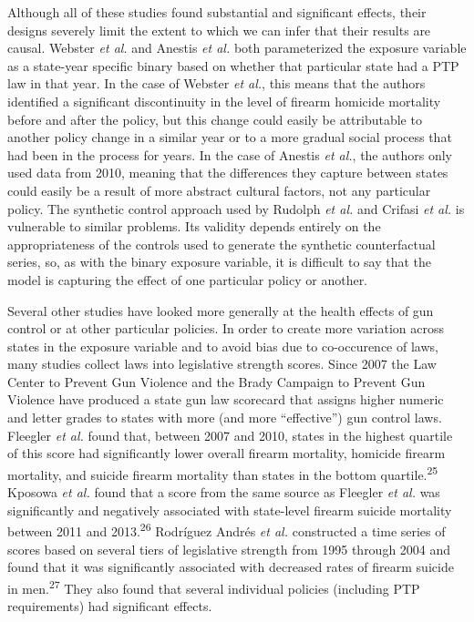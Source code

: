 \documentclass[]{article}
\begin{document}
Although all of these studies found substantial and significant effects,
their designs severely limit the extent to which we can infer that their
results are causal. Webster \emph{et al.} and Anestis \emph{et al.} both
parameterized the exposure variable as a state-year specific binary
based on whether that particular state had a PTP law in that year. In
the case of Webster \emph{et al.}, this means that the authors
identified a significant discontinuity in the level of firearm homicide
mortality before and after the policy, but this change could easily be
attributable to another policy change in a similar year or to a more
gradual social process that had been in the process for years. In the
case of Anestis \emph{et al.}, the authors only used data from 2010,
meaning that the differences they capture between states could easily be
a result of more abstract cultural factors, not any particular policy.
The synthetic control approach used by Rudolph \emph{et al.} and Crifasi
\emph{et al.} is vulnerable to similar problems. Its validity depends
entirely on the appropriateness of the controls used to generate the
synthetic counterfactual series, so, as with the binary exposure
variable, it is difficult to say that the model is capturing the effect
of one particular policy or another.

Several other studies have looked more generally at the health effects
of gun control or at other particular policies. In order to create more
variation across states in the exposure variable and to avoid bias due
to co-occurence of laws, many studies collect laws into legislative
strength scores. Since 2007 the Law Center to Prevent Gun Violence and
the Brady Campaign to Prevent Gun Violence have produced a state gun law
scorecard that assigns higher numeric and letter grades to states with
more (and more ``effective'') gun control laws. Fleegler \emph{et al.}
found that, between 2007 and 2010, states in the highest quartile of
this score had significantly lower overall firearm mortality, homicide
firearm mortality, and suicide firearm mortality than states in the
bottom quartile.\textsuperscript{25} Kposowa \emph{et al.} found that a
score from the same source as Fleegler \emph{et al.} was significantly
and negatively associated with state-level firearm suicide mortality
between 2011 and 2013.\textsuperscript{26} Rodríguez Andrés \emph{et
al.} constructed a time series of scores based on several tiers of
legislative strength from 1995 through 2004 and found that it was
significantly associated with decreased rates of firearm suicide in
men.\textsuperscript{27} They also found that several individual
policies (including PTP requirements) had significant effects.
\end{document}
